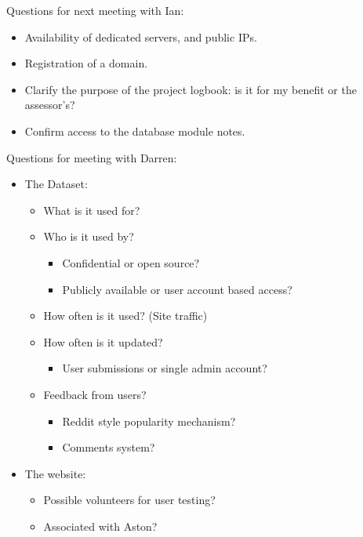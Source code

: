 \noindent
Questions for next meeting with Ian:
\begin{itemize}
\item Availability of dedicated servers, and public IPs.
\item Registration of a domain.
\item Clarify the purpose of the project logbook: is it for my benefit or the
  assessor's?
\item Confirm access to the database module notes.
\end{itemize}

\noindent
Questions for meeting with Darren:

\begin{itemize}
\item The Dataset:
  \begin{itemize}
  \item What is it used for?
  \item Who is it used by?
    \begin{itemize}
    \item Confidential or open source?
    \item Publicly available or user account based access?
    \end{itemize}
  \item How often is it used? (Site traffic)
  \item How often is it updated?
    \begin{itemize}
    \item User submissions or single admin account?
    \end{itemize}
  \item Feedback from users?
    \begin{itemize}
    \item Reddit style popularity mechanism?
    \item Comments system?
    \end{itemize}
  \end{itemize}
\item The website:
  \begin{itemize}
  \item Possible volunteers for user testing?
  \item Associated with Aston?
  \end{itemize}
\end{itemize}

